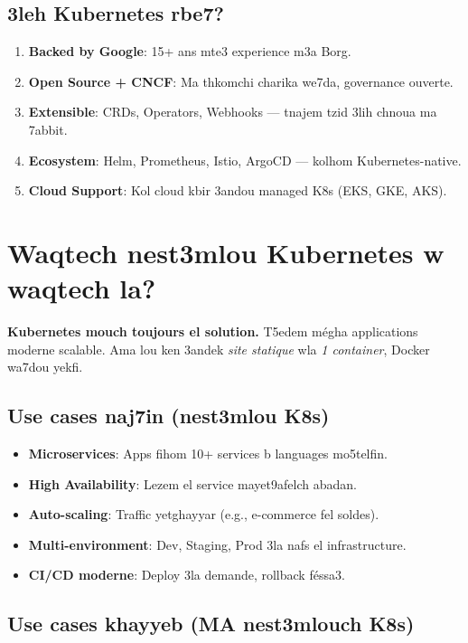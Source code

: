 \documentclass[11pt,a4paper]{book}
\newcommand{\tuni}[1]{\textit{\color{k8sdark}#1}}
\begin{document}
\subsection{3leh Kubernetes rbe7?}

\begin{enumerate}
  \item \textbf{Backed by Google}: 15+ ans mte3 experience m3a Borg.
  \item \textbf{Open Source + CNCF}: Ma thkomchi charika we7da, governance ouverte.
  \item \textbf{Extensible}: CRDs, Operators, Webhooks --- tnajem tzid 3lih chnoua ma 7abbit.
  \item \textbf{Ecosystem}: Helm, Prometheus, Istio, ArgoCD --- kolhom Kubernetes-native.
  \item \textbf{Cloud Support}: Kol cloud kbir 3andou managed K8s (EKS, GKE, AKS).
\end{enumerate}

\section{Waqtech nest3mlou Kubernetes w waqtech la?}

\begin{tipbox}
\textbf{Kubernetes mouch toujours el solution.} T5edem m\'egha applications moderne scalable. Ama lou ken 3andek \tuni{site statique} wla \tuni{1 container}, Docker wa7dou yekfi.
\end{tipbox}

\subsection{Use cases naj7in (nest3mlou K8s)}

\begin{itemize}
  \item \textbf{Microservices}: Apps fihom 10+ services b languages mo5telfin.
  \item \textbf{High Availability}: Lezem el service mayet9afelch abadan.
  \item \textbf{Auto-scaling}: Traffic yetghayyar (e.g., e-commerce fel soldes).
  \item \textbf{Multi-environment}: Dev, Staging, Prod 3la nafs el infrastructure.
  \item \textbf{CI/CD moderne}: Deploy 3la demande, rollback f\'essa3.
\end{itemize}

\subsection{Use cases khayyeb (MA nest3mlouch K8s)}
\end{document}
